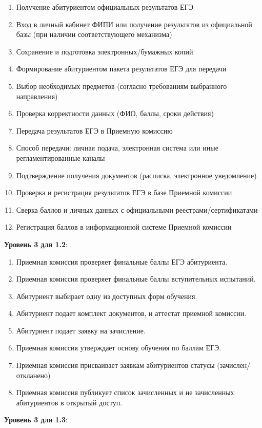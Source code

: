 \documentclass[areasetadvanced]{scrartcl}
\begin{document}
\begin{enumerate}
    \item Получение абитуриентом официальных результатов ЕГЭ
    \item Вход в личный кабинет ФИПИ или получение результатов из официальной базы (при наличии соответствующего механизма)
    \item Сохранение и подготовка электронных/бумажных копий
    \item Формирование абитуриентом пакета результатов ЕГЭ для передачи
    \item Выбор необходимых предметов (согласно требованиям выбранного направления)
    \item Проверка корректности данных (ФИО, баллы, сроки действия)
    \item Передача результатов ЕГЭ в Приемную комиссию
    \item Способ передачи: личная подача, электронная система или иные регламентированные каналы
    \item Подтверждение получения документов (расписка, электронное уведомление)
    \item Проверка и регистрация результатов ЕГЭ в базе Приемной комиссии
    \item Сверка баллов и личных данных с официальными реестрами/сертификатами
    \item Регистрация баллов в информационной системе Приемной комиссии
\end{enumerate}
\textbf{Уровень 3 для 1.2}:
\begin{enumerate}
    \item Приемная комиссия проверяет финальные баллы ЕГЭ абитуриента.
    \item Приемная комиссия проверяет финальные баллы вступительных испытаний.
    \item Абитуриент выбирает одну из доступных форм обучения.
    \item Абитуриент подает комплект документов, и аттестат приемной комиссии.
    \item Абитуриент подает заявку на зачисление.
    \item Приемная комиссия утверждает основу обучения по баллам ЕГЭ.
    \item Приемная комиссия присваивает заявкам абитуриентов статусы (зачислен/ откланено)
    \item Приемная комиссия публикует список зачисленных и не зачисленных абитуриентов в открытый доступ.
\end{enumerate}
\textbf{Уровень 3 для 1.3}:
\end{document}
